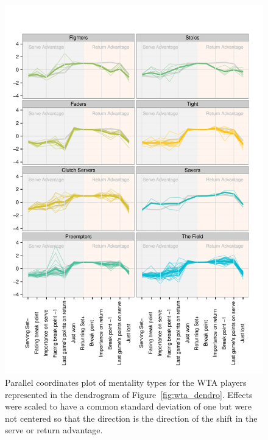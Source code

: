 \documentclass{Latex/svjour3}
\begin{document}
\begin{figure}
\includegraphics[scale=0.9]{figs/wta_coords_std_fixed.pdf}
\caption{Parallel coordinates plot of mentality types for the WTA
  players represented in the dendrogram of
  Figure~\ref{fig:wta_dendro}. Effects were scaled to have a common
  standard deviation of one but were not centered so that the
  direction is the direction of the shift in the
  serve or return advantage.}
\label{fig:wta_coord}
\end{figure}

\clearpage
\end{document}
